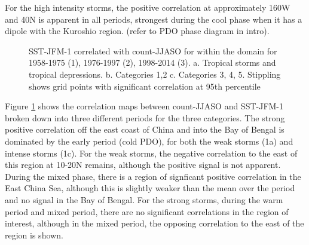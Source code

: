 For the high intensity storms, the positive correlation at approximately 160W and 40N is apparent in all periods, strongest during the cool phase when it has a dipole with the Kuroshio region. (refer to PDO phase diagram in intro).

\begin{figure}
	\centering
	
	
	
	\caption{SST-JFM-1 correlated with count-JJASO for within the domain for 1958-1975 (1), 1976-1997 (2), 1998-2014 (3). a. Tropical storms and tropical depressions. b. Categories 1,2 c. Categories 3, 4, 5.  Stippling shows grid points with significant correlation at 95th percentile} \label{fig:corr_prevJFM_periods} 
\end{figure} 

Figure \ref{fig:corr_prevJFM_periods} shows the correlation maps between count-JJASO and SST-JFM-1 broken down into three different periods for the three categories. 
The strong positive correlation off the east coast of China and into the Bay of Bengal is dominated by the early period (cold PDO), for both the weak storms (1a) and intense storms (1c). For the weak storms, the negative correlation to the east of this region at 10-20N remains, although the positive signal is not apparent. During the mixed phase, there is a region of signficant positive correlation in the East China Sea, although this is slightly weaker than the mean over the period and no signal in the Bay of Bengal.
For the strong storms, during the warm period and mixed period, there are no significant correlations in the region of interest, although in the mixed period, the opposing correlation to the east of the region is shown.



